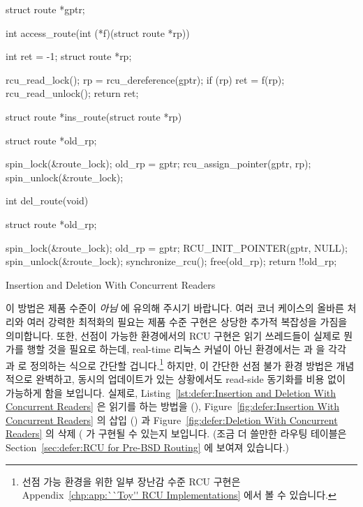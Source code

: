 \begin{listing}[tbp]
{ \scriptsize
\begin{verbbox}[\LstLineNo]
struct route *gptr;

int access_route(int (*f)(struct route *rp))
{
  int ret = -1;
  struct route *rp;

  rcu_read_lock();
  rp = rcu_dereference(gptr);
  if (rp)
  	ret = f(rp);
  rcu_read_unlock();
  return ret;
}

struct route *ins_route(struct route *rp)
{
  struct route *old_rp;

  spin_lock(&route_lock);
  old_rp = gptr;
  rcu_assign_pointer(gptr, rp);
  spin_unlock(&route_lock);
}

int del_route(void)
{
  struct route *old_rp;

  spin_lock(&route_lock);
  old_rp = gptr;
  RCU_INIT_POINTER(gptr, NULL);
  spin_unlock(&route_lock);
  synchronize_rcu();
  free(old_rp);
  return !!old_rp;
}
\end{verbbox}
}
\centering
\theverbbox
\caption{Insertion and Deletion With Concurrent Readers}
\label{lst:defer:Insertion and Deletion With Concurrent Readers}
\end{listing}

이 방법은 제품 수준이 \emph{아님} 에 유의해 주시기 바랍니다.
여러 코너 케이스의 올바른 처리와 여러 강력한 최적화의 필요는 제품 수준 구현은
상당한 추가적 복잡성을 가짐을 의미합니다.
또한, 선점이 가능한 환경에서의 RCU 구현은 읽기 쓰레드들이 실제로 뭔가를 행할
것을 필요로 하는데, real-time 리눅스 커널이 아닌 환경에서는
 과  을 각각 
과  로 정의하는 식으로 간단할 겁니다.\footnote{
	선점 가능 환경을 위한 일부 장난감 수준 RCU 구현은
	Appendix~\ref{chp:app:``Toy'' RCU Implementations} 에서 볼 수
	있습니다.}
하지만, 이 간단한 선점 불가 환경 방법은 개념적으로 완벽하고, 동시의 업데이트가
있는 상황에서도 read-side 동기화를 비용 없이 가능하게 함을 보입니다.
실제로,
Listing~\ref{lst:defer:Insertion and Deletion With Concurrent Readers}
은 읽기를 하는 방법을 (),
Figure~\ref{fig:defer:Insertion With Concurrent Readers}
의 삽입 () 과
Figure~\ref{fig:defer:Deletion With Concurrent Readers}
의 삭제 ( 가 구현될 수 있는지 보입니다.
(조금 더 쓸만한 라우팅 테이블은
Section~\ref{sec:defer:RCU for Pre-BSD Routing} 에 보여져 있습니다.)
\iffalse

